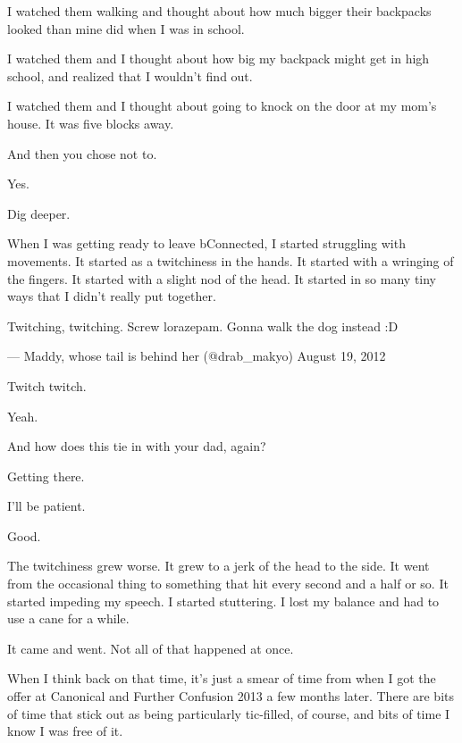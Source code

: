 \begin{paracol}{2}
\begin{leftcolumn}
I watched them walking and thought about how much bigger their backpacks looked than mine did when I was in school.

I watched them and I thought about how big my backpack might get in high school, and realized that I wouldn't find out.

I watched them and I thought about going to knock on the door at my mom's house. It was five blocks away.

\begin{ally}
And then you chose not to.
\end{ally}
Yes.

\begin{ally}
Dig deeper.
\end{ally}
\newpage

When I was getting ready to leave bConnected, I started struggling with movements. It started as a twitchiness in the hands. It started with a wringing of the fingers. It started with a slight nod of the head. It started in so many tiny ways that I didn't really put together.

Twitching, twitching. Screw lorazepam. Gonna walk the dog instead :D

--- Maddy, whose tail is behind her (@drab\_makyo) August 19, 2012

\begin{ally}
Twitch twitch.
\end{ally}
Yeah.

\begin{ally}
And how does this tie in with your dad, again?
\end{ally}
Getting there.

\begin{ally}
I'll be patient.
\end{ally}
Good.

The twitchiness grew worse. It grew to a jerk of the head to the side. It went from the occasional thing to something that hit every second and a half or so. It started impeding my speech. I started stuttering. I lost my balance and had to use a cane for a while.

\begin{ally}
It came and went. Not all of that happened at once.
\end{ally}
When I think back on that time, it's just a smear of time from when I got the offer at Canonical and Further Confusion 2013 a few months later. There are bits of time that stick out as being particularly tic-filled, of course, and bits of time I know I was free of it.


\end{leftcolumn}
\end{paracol}
